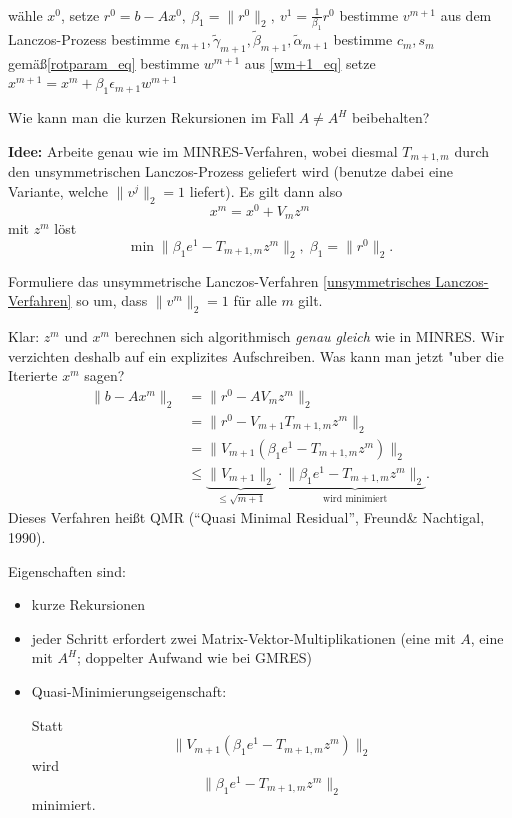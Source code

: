 \begin{alg}
~
\vspace*{-2\baselineskip}
\begin{algorithm}
\begin{algorithmic}
\STATE w\"ahle $x^0$, setze $r^0=b-Ax^0,\ \beta_1=\|r^0\|_2,\ v^1=\frac{1}{\beta_1}r^0$
\STATE bestimme $v^{m+1}$ aus dem Lanczos-Prozess
\STATE bestimme $\epsilon_{m+1},\tilde\gamma_{m+1},\tilde\beta_{m+1},\tilde\alpha_{m+1}$
\STATE bestimme $c_m,s_m$ gem\"a\ss \eqref{rotparam_eq}\hfill{}
\STATE bestimme $w^{m+1}$ aus \eqref{wm+1_eq}
\STATE setze $x^{m+1}=x^m+\beta_1 \epsilon_{m+1}w^{m+1}$
\ENDFOR
\end{algorithmic}
\end{algorithm}
\end{alg}

\bigskip

Wie kann man die kurzen Rekursionen im Fall $A\ne A^H$ beibehalten?

\textbf{Idee:} Arbeite genau wie im MINRES-Verfahren, wobei diesmal $T_{m+1,m}$ durch den unsymmetrischen
Lanczos-Prozess geliefert wird (benutze dabei eine Variante, welche $\|v^j\|_2=1 $ liefert). Es gilt dann also
\[
x^m=x^0+V_mz^m
\]
mit $z^m$ l\"ost
\[
\min\|\beta_1e^1-T_{m+1,m}z^m\|_2,\; \beta_1=\|r^0\|_2.
\]

\begin{aufg}
Formuliere das unsymmetrische Lanczos-Verfahren \ref{unsymmetrisches Lanczos-Verfahren} so um, dass
$\|v^m\|_2=1$ f\"ur alle $m$ gilt.
\end{aufg}

Klar: $z^m$ und $x^m$ berechnen sich algorithmisch \emph{genau gleich} wie in MINRES. Wir verzichten deshalb auf ein explizites Aufschreiben. Was kann man jetzt "uber die Iterierte $x^m$ sagen?
\begin{align*}
\|b-Ax^m\|_2&=\|r^0-AV_mz^m\|_2\\
&=\|r^0-V_{m+1}T_{m+1,m}z^m\|_2\\
&=\|V_{m+1}(\beta_1e^1-T_{m+1,m}z^m)\|_2\\
&\le\underbrace{\|V_{m+1}\|_2}_{\le\sqrt{m+1}}\cdot\underbrace{\|\beta_1e^1-T_{m+1,m}z^m\|_2}_{\text{wird minimiert}}.
\end{align*}
Dieses Verfahren hei\ss t QMR ("`Quasi Minimal Residual"', Freund\& Nachtigal, 1990).

Eigenschaften sind:
\begin{itemize}
\item kurze Rekursionen
\item jeder Schritt erfordert zwei Matrix-Vektor-Multiplikationen (eine mit $A$, eine mit $A^H$; doppelter Aufwand wie bei GMRES)
\item Quasi-Minimierungseigenschaft:

Statt
\[
\|V_{m+1}(\beta_1e^1-T_{m+1,m}z^m)\|_2
\]
wird
\[
\|\beta_1e^1-T_{m+1,m}z^m\|_2
\]
minimiert.
\end{itemize}


